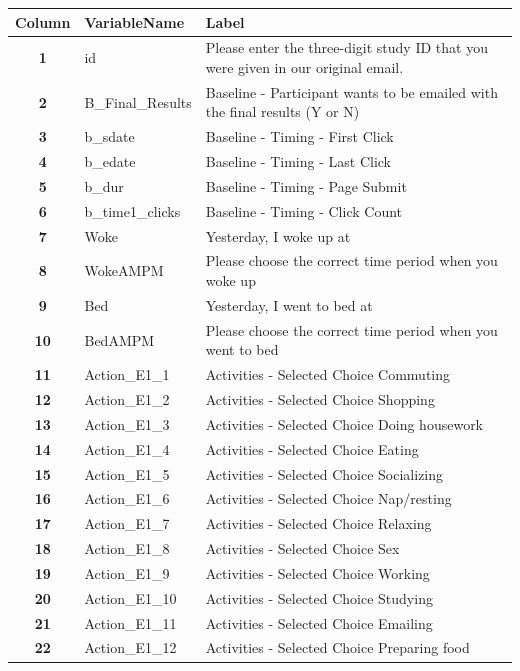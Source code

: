 \documentclass[
  letterpaper,
  DIV=11,
  numbers=noendperiod]{scrartcl}
\begin{document}
\begin{longtable}[t]{>{}cll}
\toprule
Column & VariableName & Label\\
\midrule
\textbf{1} & id & Please enter the three-digit study ID that you were given in our original email.\\
\textbf{2} & B\_Final\_Results & Baseline - Participant wants to be emailed with the final results (Y or N)\\
\textbf{3} & b\_sdate & Baseline - Timing - First Click\\
\textbf{4} & b\_edate & Baseline - Timing - Last Click\\
\textbf{5} & b\_dur & Baseline - Timing - Page Submit\\
\addlinespace
\textbf{6} & b\_time1\_clicks & Baseline - Timing - Click Count\\
\textbf{7} & Woke & Yesterday, I woke up at\\
\textbf{8} & WokeAMPM & Please choose the correct time period when you woke up\\
\textbf{9} & Bed & Yesterday, I went to bed at\\
\textbf{10} & BedAMPM & Please choose the correct time period when you went to bed\\
\addlinespace
\textbf{11} & Action\_E1\_1 & Activities - Selected Choice Commuting\\
\textbf{12} & Action\_E1\_2 & Activities - Selected Choice Shopping\\
\textbf{13} & Action\_E1\_3 & Activities - Selected Choice Doing housework\\
\textbf{14} & Action\_E1\_4 & Activities - Selected Choice Eating\\
\textbf{15} & Action\_E1\_5 & Activities - Selected Choice Socializing\\
\addlinespace
\textbf{16} & Action\_E1\_6 & Activities - Selected Choice Nap/resting\\
\textbf{17} & Action\_E1\_7 & Activities - Selected Choice Relaxing\\
\textbf{18} & Action\_E1\_8 & Activities - Selected Choice Sex\\
\textbf{19} & Action\_E1\_9 & Activities - Selected Choice Working\\
\textbf{20} & Action\_E1\_10 & Activities - Selected Choice Studying\\
\addlinespace
\textbf{21} & Action\_E1\_11 & Activities - Selected Choice Emailing\\
\textbf{22} & Action\_E1\_12 & Activities - Selected Choice Preparing food\\

\end{longtable}
\end{document}
